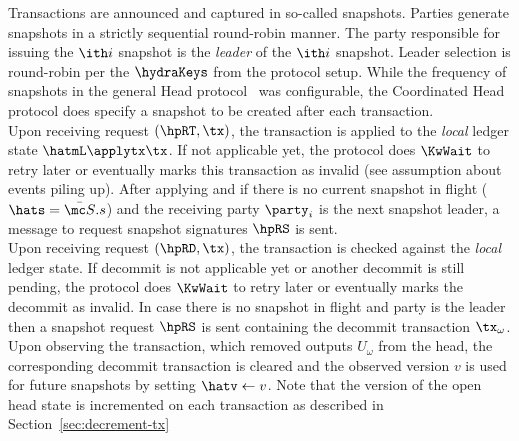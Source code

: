 Transactions are announced and captured in so-called snapshots. Parties generate
snapshots in a strictly sequential round-robin manner. The party responsible for
issuing the $\ith i$ snapshot is the \emph{leader} of the $\ith i$ snapshot.
Leader selection is round-robin per the $\hydraKeys$ from the protocol setup.
While the frequency of snapshots in the general Head protocol~\cite{hydrahead20}
was configurable, the Coordinated Head protocol does specify a snapshot to be
created after each transaction.\\

\quad Upon receiving request $(\hpRT,\tx)$, the transaction is
applied to the \emph{local} ledger state $\hatmL \applytx \tx$. If not
applicable yet, the protocol does $\KwWait$ to retry later or eventually marks
this transaction as invalid (see assumption about events piling up). After
applying and if there is no current snapshot in flight ($\hats = \bar{\mc S}.s$) and the
receiving party $\party_{i}$ is the next snapshot
leader, a message to request snapshot signatures $\hpRS$ is sent. \\

\quad Upon receiving request $(\hpRD,\tx)$, the transaction is
checked against the \emph{local} ledger state. If decommit is not applicable yet
or another decommit is still pending, the protocol does $\KwWait$ to retry later or
eventually marks the decommit as invalid. In case there is no snapshot in flight
and party is the leader then a snapshot request $\hpRS$ is
sent containing the decommit transaction $\tx_{\omega}$. \\

\quad Upon observing the \mtxDecrement{}
transaction, which removed outputs $U_{\omega}$ from the head, the corresponding
decommit transaction is cleared and the observed version $v$ is used for future
snapshots by
setting $\hatv \gets v$. Note that the version of the open head state is incremented on each \mtxDecrement{} transaction as described in Section~\ref{sec:decrement-tx} \\

